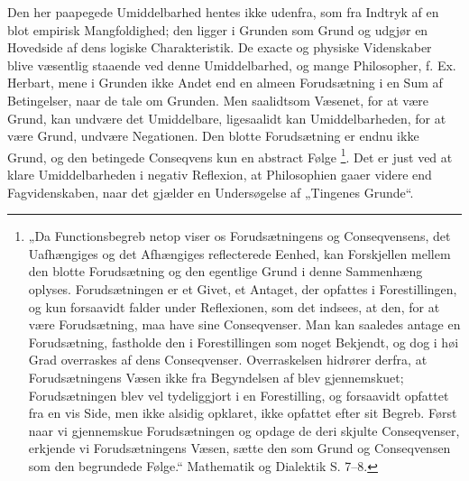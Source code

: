 \documentclass[11pt]{book}
\begin{document}
Den her paapegede Umiddelbarhed hentes ikke udenfra, som
fra Indtryk af en blot empirisk Mangfoldighed; den ligger i
Grunden som Grund og udgjør en Hovedside af dens logiske
Charakteristik. De exacte og physiske Videnskaber blive
væsentlig staaende ved denne Umiddelbarhed, og mange
Philosopher, f. Ex. Herbart, mene i Grunden ikke Andet end
en almeen Forudsætning i en Sum af Betingelser, naar de tale
om Grunden. Men saalidtsom Væsenet, for at være Grund,
kan undvære det Umiddelbare, ligesaalidt kan
Umiddelbarheden, for at være Grund, undvære Negationen.
Den blotte Forudsætning er endnu ikke Grund, og den
betingede Conseqvens kun en abstract
Følge%
\footnote{„Da Functionsbegreb netop viser os Forudsætningens og
Conseqvensens, det Uafhængiges og det Afhængiges reflecterede
Eenhed, kan Forskjellen mellem den blotte Forudsætning og den
egentlige Grund i denne Sammenhæng oplyses. Forudsætningen er
et Givet, et Antaget, der opfattes i Forestillingen, og kun
forsaavidt falder
under Reflexionen, som det indsees, at den, for at være
Forudsætning, maa have sine Conseqvenser. Man kan saaledes
antage en Forudsætning, fastholde den i Forestillingen som
noget Bekjendt, og dog i høi Grad overraskes af dens
Conseqvenser. Overraskelsen hidrører derfra, at
Forudsætningens Væsen ikke fra Begyndelsen af blev
gjennemskuet; Forudsætningen blev vel tydeliggjort i en
Forestilling, og forsaavidt opfattet fra en vis Side, men ikke
alsidig opklaret, ikke opfattet efter sit Begreb. Først naar vi
gjennemskue Forudsætningen og opdage de deri skjulte
Conseqvenser, erkjende vi Forudsætningens Væsen, sætte den
som Grund og Conseqvensen som den begrundede Følge.“
Mathematik og Dialektik S. 7--8.}. Det er just ved at klare
Umiddelbarheden i negativ Reflexion, at Philosophien gaaer
videre end Fagvidenskaben, naar det gjælder en Undersøgelse
af „Tingenes Grunde“.
\end{document}
